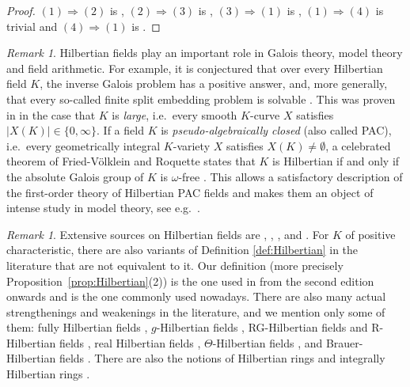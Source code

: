 \documentclass[10pt,a4paper]{amsart}
\theoremstyle{plain}
\theoremstyle{remark}
\newtheorem{remark}[theorem]{Remark}
\numberwithin{theorem}{section}
\begin{document}
\begin{proof}
$(1)\Rightarrow(2)$ is \cite[Prop.~13.2.2]{FJ},
$(2)\Rightarrow(3)$ is \cite[Lemma 12.1.6]{FJ},
$(3)\Rightarrow(1)$ is \cite[Lemma 13.1.2]{FJ}, 
$(1)\Rightarrow(4)$ is trivial
and $(4)\Rightarrow(1)$ is \cite[Theorem 1.1]{BarySoroker}.    
\end{proof}

\begin{remark}\label{rem:PAC}
Hilbertian fields play an important role in Galois theory, model theory and field arithmetic.    
For example, it is conjectured that over every Hilbertian field $K$,
the inverse Galois problem has a positive answer,
and, more generally,
that every so-called finite split embedding problem is solvable \cite{DD}.
This was proven in \cite{Pop} in the case that $K$ is {\em large},
i.e.~every smooth $K$-curve $X$ satisfies $|X(K)|\in\{0,\infty\}$.
If a field $K$ is {\em pseudo-algebraically closed} (also called PAC),
i.e.~every geometrically integral $K$-variety $X$ satisfies $X(K)\neq\emptyset$,
a celebrated theorem of Fried-Völklein and Roquette states that $K$ is Hilbertian if and only if the absolute Galois group of $K$ is $\omega$-free \cite[Theorem 5.10.3]{Jarden_patching}.
This allows a satisfactory description of the first-order theory of Hilbertian PAC fields 
and makes them an object of intense study in model theory, see e.g.~\cite{Chatzidakis}.
\end{remark}

\begin{remark}\label{rem:Hilbertian_def}
Extensive sources on Hilbertian fields are
\cite[Chapter 9]{Lang_fundamentals},
\cite[Chapters 12-16]{FJ},
\cite[Chapter IV]{MM}, and
\cite[Chapter 1]{Völklein}.
For $K$ of positive characteristic, 
there are also variants of Definition \ref{def:Hilbertian} in the literature that are not equivalent to it.
Our definition (more precisely Proposition~\ref{prop:Hilbertian}(2))
is the one used in \cite{FJ} from the second edition onwards
and is the one commonly used nowadays.
There are also many actual strengthenings and weakenings in the literature, 
and we mention only some of them:
fully Hilbertian fields \cite{BP},
$g$-Hilbertian fields \cite[Chapter 13.6]{FJ},
RG-Hilbertian fields and R-Hilbertian fields \cite{DH},
real Hilbertian fields \cite{FHV},
$\Theta$-Hilbertian fields \cite{FH},
and Brauer-Hilbertian fields \cite{FSS}.
There are also the notions of  Hilbertian rings \cite[Chapter 13.4]{FJ}
and integrally Hilbertian rings \cite{BD}.
\end{remark}
\end{document}
